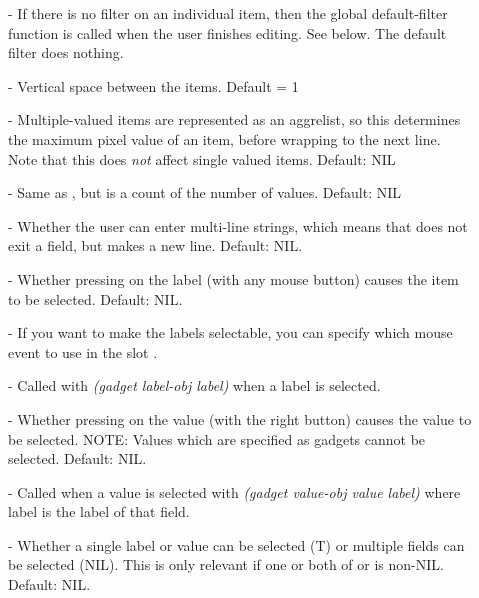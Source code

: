 \begin{description}
\item[]  - If there is no filter on an individual item, then the
global default-filter function is called when the user finishes
editing.  See below.  The default filter does nothing.

\item[]  - Vertical space between the items.  Default = 1

\item[]  - Multiple-valued items are represented as an aggrelist,
so this determines the maximum pixel value of an item, before
wrapping to the next line.  Note that this does {\it not} affect single
valued items.  Default: NIL

\item[]  - Same as , but is a count of the number of
values.  Default: NIL

\item[]  - Whether the user can enter multi-line strings,
which means that  does not exit a field, but makes a new line.
Default: NIL.

\item[]  - Whether pressing on the label (with any mouse
button) causes the item to be selected.  Default: NIL.

\item[]  - If you want to make the labels selectable,
you can specify which mouse event to use in the slot .

\item[]  - Called with {\it (gadget label-obj label)}
when a label is selected.

\item[]  - Whether pressing on the value (with the right button)
causes the value to be selected.  NOTE: Values which are specified as
gadgets cannot be selected.  Default: NIL.

\item[]  - Called when a value is selected with
{\it (gadget value-obj value label)} where label is the label of that
field.

\item[]  - Whether a single label or value can be
selected (T) or multiple fields can be selected (NIL).  This is only
relevant if one or both of  or
 is non-NIL.  Default: NIL.

\end{description}

